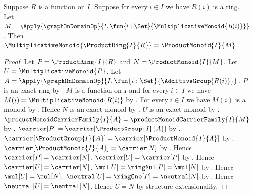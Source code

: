 \begin{theorem}\label{product_ring_multiplicative_monoid}
    Suppose $R$ is a function on $I$.
    Suppose for every $i\in I$ we have $R(i)$ is a ring.
    Let
        $M=\Apply{\graphOnDomainOp}{
            I,\fun{i:\Set}{\MultiplicativeMonoid{R(i)}}}$.
    Then
        $\MultiplicativeMonoid{\ProductRing{I}{R}}
            =\ProductMonoid{I}{M}$.
\end{theorem}
\begin{proof}
    Let $P=\ProductRing{I}{R}$ and $N=\ProductMonoid{I}{M}$.
    Let $U=\MultiplicativeMonoid{P}$.
    Let $A=\Apply{\graphOnDomainOp}{
        I,\fun{i:\Set}{\AdditiveGroup{R(i)}}}$.
    $P$ is an exact ring by .
    $M$ is a function on $I$ and for every $i\in I$ we have
        $M(i)=\MultiplicativeMonoid{R(i)}$ by
        .
    For every $i\in I$ we have $M(i)$ is a monoid by
        .
    Hence $N$ is an exact monoid by .
    $U$ is an exact monoid by
        .
    $\productMonoidCarrierFamily{I}{A}
        =\productMonoidCarrierFamily{I}{M}$ by
        .
    $\carrier[P]=\carrier[\ProductGroup{I}{A}]$ by
        .
    $\carrier[\ProductGroup{I}{A}]
        =\carrier[\ProductMonoid{I}{A}]$ by
        .
    $\carrier[\ProductMonoid{I}{A}]
        =\carrier[N]$ by
        .
    Hence $\carrier[P]=\carrier[N]$.
    $\carrier[U]=\carrier[P]$ by
        .
    Hence $\carrier[U]=\carrier[N]$.
    $\mul[U]=\ringMul[P]=\mul[N]$ by
        .
    Hence $\mul[U]=\mul[N]$.
    $\neutral[U]=\ringOne[P]=\neutral[N]$ by
        .
    Hence $\neutral[U]=\neutral[N]$.
    Hence $U=N$ by structure extensionality.
\end{proof}

